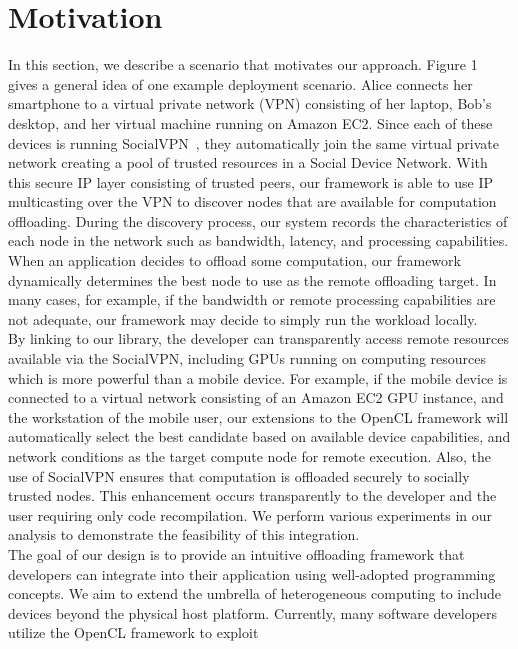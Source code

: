 \documentclass[10pt, conference, compsocconf]{IEEEtran}
\begin{document}
\section{Motivation}
%
In this section, we describe a scenario that motivates our approach.
%
Figure 1 gives a general idea of one example deployment scenario.
%
Alice connects her smartphone to a virtual private network (VPN) consisting 
of her laptop, Bob's desktop, and her virtual machine running on Amazon EC2.
%
Since each of these devices is running SocialVPN~\cite{socialvpn}, they 
automatically join the same virtual private network creating a pool of trusted 
resources in a Social Device Network.
%
With this secure IP layer consisting of trusted peers, our framework is 
able to use IP multicasting over the VPN to discover nodes that are available 
for computation offloading.
%
During the discovery process, our system records the characteristics of each 
node in the network such as bandwidth, latency, and processing capabilities.
%
When an application decides to offload some computation, our framework 
dynamically determines the best node to use as the remote offloading target.
%
In many cases, for example, if the bandwidth or remote processing capabilities 
are not adequate, our framework may decide to simply run the workload
locally.\\
%
\indent By linking to our library, the developer can transparently access remote 
resources available via the SocialVPN, including GPUs running on computing
resources which is more powerful than a mobile 
device.
%
For example, if the mobile device is connected to a virtual network 
consisting of an Amazon EC2 GPU instance, and the workstation of the
mobile user, our extensions to the OpenCL framework will automatically 
select the best candidate based on available device capabilities, and 
network conditions as the target compute node for remote execution.
%
Also, the use of SocialVPN ensures that computation is offloaded securely
to socially trusted nodes.
%
This enhancement occurs transparently to the developer and the user 
requiring only code recompilation.
%
We perform various experiments in our analysis to demonstrate the 
feasibility of this integration.\\
%
\indent The goal of our design is to provide an intuitive offloading framework that 
developers can integrate into their application using well-adopted 
programming concepts.
%
We aim to extend the umbrella of heterogeneous computing to include devices
beyond the physical host platform.
%
Currently, many software developers utilize the OpenCL framework to exploit 
\end{document}

